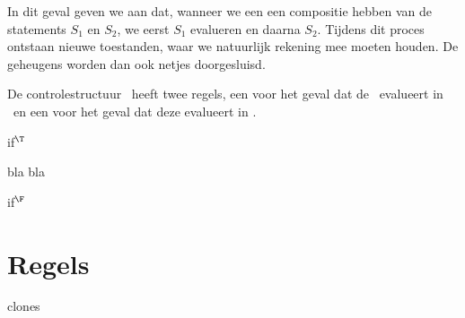 In dit geval geven we aan dat, wanneer we een een compositie hebben van de statements $S_1$ en $S_2$, we eerst $S_1$ evalueren%
en daarna $S_2$. Tijdens dit proces ontstaan nieuwe toestanden, waar we natuurlijk rekening mee moeten houden. De geheugens worden dan ook netjes doorgesluisd.

De controlestructuur \IF\ heeft twee regels, een voor het geval dat de \BExpr\ evalueert in \T\ en een voor het geval dat deze evalueert in \F.

\begin{NSAxiom}{if$^\T$}
  \begin{prooftree}
  \end{prooftree}
  \begin{NSConditions}
  \end{NSConditions}
\end{NSAxiom}

bla bla

\begin{NSAxiom}{if$^\F$}
  \begin{prooftree}
  \end{prooftree}
  \begin{NSConditions}
  \end{NSConditions}
\end{NSAxiom}


\section{Regels}

\begin{NSAxiom}{clones}
  \begin{prooftree}
  \end{prooftree}
  \begin{NSConditions}
  \end{NSConditions}
\end{NSAxiom}

